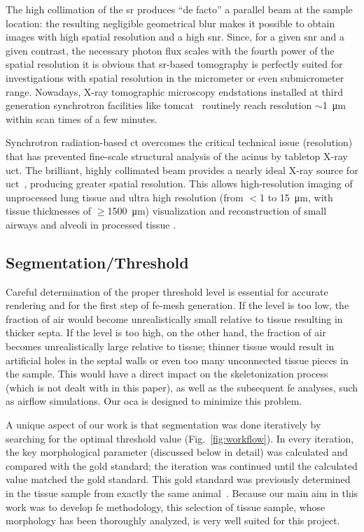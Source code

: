 The high collimation of the \ac{sr} produces ``de facto'' a parallel beam at the sample location: the resulting negligible geometrical blur makes it possible to obtain images with high spatial resolution and a high \ac{snr}. Since, for a given \ac{snr} and a given contrast, the necessary photon flux scales with the fourth power of the spatial resolution \cite{Bonse1996} it is obvious that \ac{sr}-based tomography is perfectly suited for investigations with spatial resolution in the micrometer or even submicrometer range. Nowadays, X-ray tomographic microscopy endstations installed at third generation synchrotron facilities like \ac{tomcat}~\cite{Stampanoni2007} routinely reach resolution $\sim$\SI{1}{\micro\meter} within scan times of a few minutes.

Synchrotron radiation-based \ac{ct} overcomes the critical technical issue (resolution) that has prevented fine-scale structural analysis of the acinus by tabletop X-ray \ac{uct}. The brilliant, highly collimated beam provides a nearly ideal X-ray source for \ac{uct}~\cite{Jorgensen1998}, producing greater spatial resolution. This allows high-resolution imaging of unprocessed lung tissue \cite{Bayat2006,Jheon2006,Monfraix2005,Sera2007,Sera2005} and ultra high resolution (from $<$1 to \SI{15}{\micro\meter}, with tissue thicknesses of $\geq$\SI{1500}{\micro\meter}) visualization and \threed reconstruction of small airways and alveoli in processed tissue \cite{Ikura2004,Schittny2008}.

\subsection{Segmentation/Threshold}
Careful determination of the proper threshold level is essential for accurate \threed rendering and for the first step of \ac{fe}-mesh generation. If the level is too low, the fraction of air would become unrealistically small relative to tissue resulting in thicker septa. If the level is too high, on the other hand, the fraction of air becomes unrealistically large relative to tissue; thinner tissue would result in artificial holes in the septal walls or even too many unconnected tissue pieces in the sample. This would have a direct impact on the skeletonization process (which is not dealt with in this paper), as well as the subsequent \ac{fe} analyses, such as airflow simulations. Our \ac{oca} is designed to minimize this problem.

A unique aspect of our work is that segmentation was done iteratively by searching for the optimal threshold value (Fig.~\ref{fig:workflow}). In every iteration, the key morphological parameter (discussed below in detail) was calculated and compared with the gold standard; the iteration was continued until the calculated value matched the gold standard. This gold standard was previously determined in the tissue sample from exactly the same animal~\cite{Tschanz2003}. Because our main aim in this work was to develop \ac{fe} methodology, this selection of tissue sample, whose morphology has been thoroughly analyzed, is very well suited for this project.

